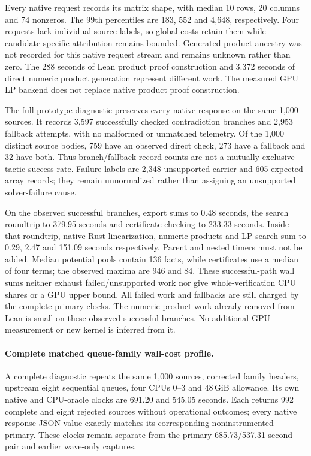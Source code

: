 \documentclass[10pt,twocolumn]{article}
\begin{document}
Every native request records its matrix shape, with median 10 rows, 20 columns
and 74 nonzeros. The 99th percentiles are 183, 552 and 4,648, respectively.
Four requests lack individual source labels, so global costs retain them
while candidate-specific attribution remains bounded.
Generated-product ancestry was not recorded for this native request stream
and remains unknown rather than zero.
The 288 seconds of Lean product proof construction and 3.372 seconds of direct
numeric product generation represent different work. The measured GPU LP
backend does not replace native product proof construction.

The full prototype diagnostic preserves every native response on the same
1,000 sources. It records 3,597 successfully checked contradiction branches
and 2,953 fallback attempts, with no malformed or unmatched telemetry.
Of the 1,000 distinct source bodies, 759 have an observed direct check,
273 have a fallback and 32 have both. Thus branch/fallback record counts
are not a mutually exclusive tactic success rate. Failure labels are
2,348 unsupported-carrier and 605 expected-array records; they remain
unnormalized rather than assigning an unsupported solver-failure cause.

On the observed successful branches, export sums to 0.48 seconds, the search
roundtrip to 379.95 seconds and certificate checking to 233.33 seconds.
Inside that roundtrip, native Rust linearization, numeric products and LP
search sum to 0.29, 2.47 and 151.09 seconds respectively. Parent and nested
timers must not be added. Median potential pools contain 136 facts, while
certificates use a median of four terms; the observed maxima are 946 and
84. These successful-path wall sums neither exhaust failed/unsupported
work nor give whole-verification CPU shares or a GPU upper bound.
All failed work and fallbacks are still charged by the complete primary
clocks. The numeric product work already removed from Lean is small on
these observed successful branches. No additional GPU measurement or
new kernel is inferred from it.

\paragraph{Complete matched queue-family wall-cost profile.}
A complete diagnostic repeats the same 1,000 sources, corrected family
headers, upstream eight sequential queues, four CPUs 0--3 and
48\,GiB allowance. Its own native and CPU-oracle clocks are 691.20 and
545.05 seconds. Each returns 992 complete and eight rejected sources without
operational outcomes; every native response JSON value exactly matches its
corresponding noninstrumented primary. These clocks remain separate from
the primary 685.73/537.31-second pair and earlier wave-only captures.
\end{document}
